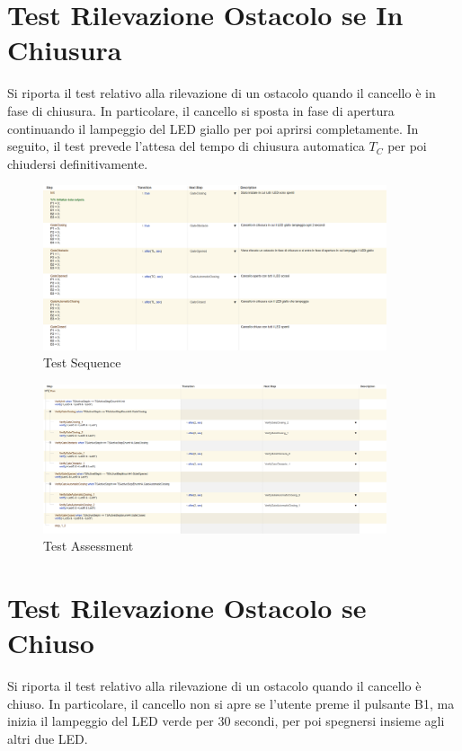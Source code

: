     \section{Test Rilevazione Ostacolo se In Chiusura}
        Si riporta il test relativo alla rilevazione di un ostacolo quando il cancello è in fase di chiusura.
        In particolare, il cancello si sposta in fase di apertura continuando il lampeggio del LED giallo per poi aprirsi completamente.
        In seguito, il test prevede l'attesa del tempo di chiusura automatica $T_C$ per poi chiudersi definitivamente.

        \begin{figure}[H]
            \centering
            \includegraphics[width=0.9\textwidth]{figures/automaticclosing.png}
            \caption{Test Sequence}
            \label{autom}
        \end{figure}
        
        \begin{figure}[H]
            \centering
            \includegraphics[width=0.9\textwidth]{figures/automaticclosing1.png}
            \caption{Test Assessment}
            \label{autom1}
        \end{figure}

    
    \section{Test Rilevazione Ostacolo se Chiuso}
        Si riporta il test relativo alla rilevazione di un ostacolo quando il cancello è chiuso. In particolare, il cancello non si apre se l'utente preme il pulsante B1, ma inizia il lampeggio del LED verde per 30 secondi, per poi spegnersi insieme agli altri due LED.

